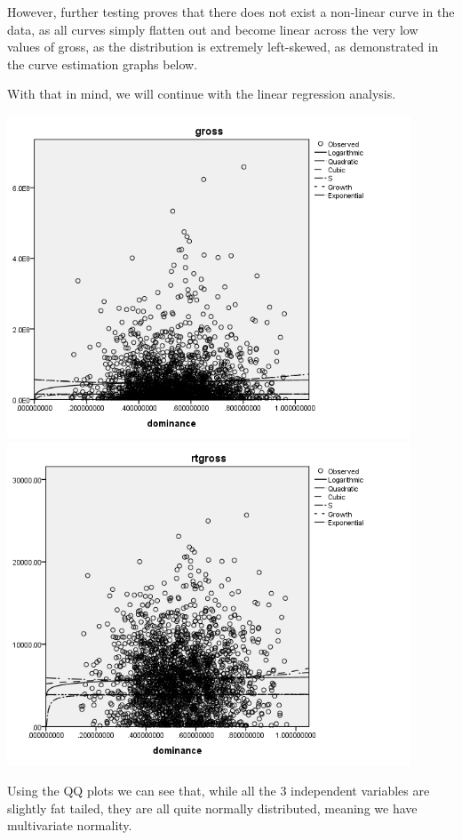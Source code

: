 \documentclass[font=10pt]{article}
\begin{document}
However, further testing proves that there does not exist a non-linear curve in the data, as all curves simply flatten out and become linear across the very low values of gross, as the distribution is extremely left-skewed, as demonstrated in the curve estimation graphs below. 

With that in mind, we will continue with the linear regression analysis.

\begin{center}
	\includegraphics[width=12cm]{curve_estimation}
	\includegraphics[width=12cm]{rtgross_curve_estimation}
\end{center}

Using the QQ plots we can see that, while all the 3 independent variables are slightly fat tailed, they are all quite normally distributed, meaning we have multivariate normality.
\end{document}
